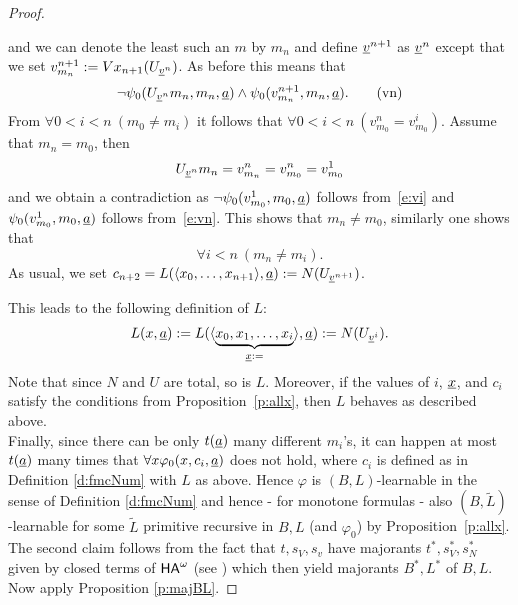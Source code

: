 \begin{proof}
\begin{enumerate}
\[\]
and we can denote the least such an $m$ by $m_n$ and define $\underline v^{n+1}$ as $\underline v^n$ except that we set $v^{n+1}_{m_n}:=Vx_{n+1}(U_{\underline v^n})$. As before this means that
\[ \neg\psi_0(U_{\underline v^n}m_n,m_n,\underline a) \wedge \psi_0(v^{n+1}_{m_n},m_n,\underline a). \tag{vn}\label{e:vn}\]
From $\forall 0<i<n\ ( m_0\neq m_i )$ it follows that $\forall0<i<n\ ( v^n_{m_0}=v^i_{m_0})$. Assume that $m_n = m_0$, then
\[U_{\underline v^n}m_n=v^n_{m_n}=v^n_{m_0}=v^1_{m_0}\]
and we obtain a contradiction as $\neg\psi_0(v^1_{m_0},m_0,\underline a)$ follows from~\eqref{e:vi} and $\psi_0(v^1_{m_0},m_0,\underline a)$ follows from~\eqref{e:vn}. This shows that 
$m_n \neq m_0$, similarly one shows that \[ \forall i<n\ (m_n \neq m_i).\]
As usual, we set $c_{n+2}=L(\langle x_0,\ldots,x_{n+1}\rangle,\underline a):=
N(U_{\underline v^{n+1}})$.
\end{enumerate}
This leads to the following definition of $L$:
\begin{align*}
 L(x,\underline a):= 
 L(\langle \underbrace {x_0,x_1,\ldots,x_i}_{\underline x:=}\rangle,\underline a):=
N(U_{\underline v^{i}}). 
\end{align*}
Note that since $N$ and $U$ are total, so is $L$. 
Moreover, if the values of $i$, $\underline x$, and $c_i$ satisfy the conditions from Proposition~\ref{p:allx}, then $L$ 
behaves as described above.\\
Finally, since there can be only $t(\underline a)$ many different $m_i$'s, it can happen at most $t(\underline a)$ many 
times that $\forall x \varphi_0(x,c_i,\underline a)$ does not hold, where
$c_i$ is defined as in Definition \ref{d:fmcNum} with $L$ as above. Hence 
$\varphi$ is $(B,L)$-learnable in the sense of  Definition \ref{d:fmcNum} 
and hence - for monotone formulas - also $(B,\tilde{L})$-learnable 
for some $\tilde{L}$ primitive recursive in $B,L$ (and $\varphi_0$) 
by Proposition~\ref{p:allx}. 
\\ The 
second claim follows from the fact that $t,s_V,s_v$ have majorants $t^*,
s^*_V,s^*_N$ 
given by closed terms of ${\textsf{\upshape HA}}^\omega$ (see \cite{Kohlenbach08}) which then 
yield majorants $B^*,L^*$ of $B,L.$ Now apply  
Proposition \ref{p:majBL}.
\end{proof} 
